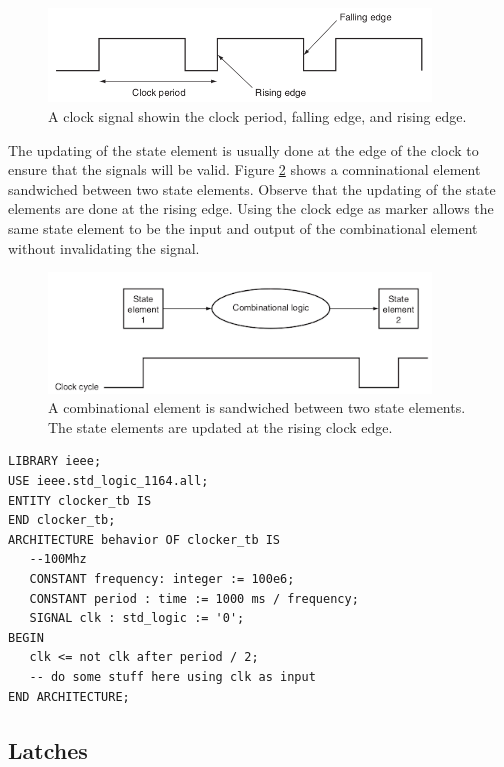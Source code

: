 \documentclass[a4paper, 11pt,oneside]{article}
\begin{document}
\begin{figure}[H]
	\begin{center}
	\includegraphics[width=4in]{clock0.png}
	\caption{A clock signal showin the clock period, falling edge, and rising edge.}
	\label{fig:clock0} 
	\end{center}
\end{figure}

The updating of the state element is usually done at the edge of the clock to ensure that the signals will be valid. Figure \ref{fig:clock1} shows a comninational element sandwiched between two state elements. Observe that the updating of the state elements are done at the rising edge. Using the clock edge as marker allows the same state element to be the input and output of the combinational element without invalidating the signal. 

\begin{figure}[H]
	\begin{center}
	\includegraphics[width=4in]{clock1.png}
	\caption{A combinational element is sandwiched between two state elements. The state elements are updated at the rising clock edge.}
	\label{fig:clock1} 
	\end{center}
\end{figure}


\begin{verbatim}
LIBRARY ieee;
USE ieee.std_logic_1164.all;
ENTITY clocker_tb IS
END clocker_tb;
ARCHITECTURE behavior OF clocker_tb IS
   --100Mhz
   CONSTANT frequency: integer := 100e6; 
   CONSTANT period : time := 1000 ms / frequency;
   SIGNAL clk : std_logic := '0';
BEGIN 
   clk <= not clk after period / 2;
   -- do some stuff here using clk as input
END ARCHITECTURE;
\end{verbatim}

\subsection{Latches}
\end{document}
